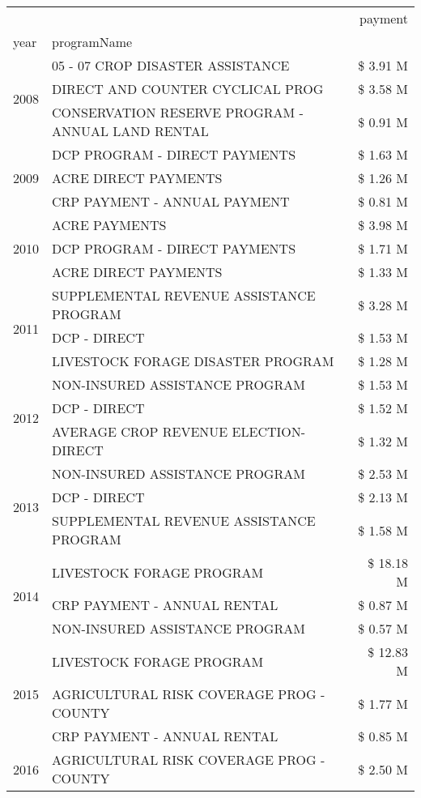 \begin{tabular}{llr}
\toprule
 &  & payment \\
year & programName &  \\
\midrule
\multirow[t]{3}{*}{2008} & 05 - 07 CROP DISASTER ASSISTANCE & \$ 3.91 M \\
 & DIRECT AND COUNTER CYCLICAL PROG & \$ 3.58 M \\
 & CONSERVATION RESERVE PROGRAM - ANNUAL LAND RENTAL & \$ 0.91 M \\
\cline{1-3}
\multirow[t]{3}{*}{2009} & DCP PROGRAM - DIRECT PAYMENTS & \$ 1.63 M \\
 & ACRE DIRECT PAYMENTS & \$ 1.26 M \\
 & CRP PAYMENT - ANNUAL PAYMENT & \$ 0.81 M \\
\cline{1-3}
\multirow[t]{3}{*}{2010} & ACRE PAYMENTS & \$ 3.98 M \\
 & DCP PROGRAM - DIRECT PAYMENTS & \$ 1.71 M \\
 & ACRE DIRECT PAYMENTS & \$ 1.33 M \\
\cline{1-3}
\multirow[t]{3}{*}{2011} & SUPPLEMENTAL REVENUE ASSISTANCE PROGRAM & \$ 3.28 M \\
 & DCP - DIRECT & \$ 1.53 M \\
 & LIVESTOCK FORAGE DISASTER PROGRAM & \$ 1.28 M \\
\cline{1-3}
\multirow[t]{3}{*}{2012} & NON-INSURED ASSISTANCE PROGRAM & \$ 1.53 M \\
 & DCP - DIRECT & \$ 1.52 M \\
 & AVERAGE CROP REVENUE ELECTION-DIRECT & \$ 1.32 M \\
\cline{1-3}
\multirow[t]{3}{*}{2013} & NON-INSURED ASSISTANCE PROGRAM & \$ 2.53 M \\
 & DCP - DIRECT & \$ 2.13 M \\
 & SUPPLEMENTAL REVENUE ASSISTANCE PROGRAM & \$ 1.58 M \\
\cline{1-3}
\multirow[t]{3}{*}{2014} & LIVESTOCK FORAGE PROGRAM & \$ 18.18 M \\
 & CRP PAYMENT - ANNUAL RENTAL & \$ 0.87 M \\
 & NON-INSURED ASSISTANCE PROGRAM & \$ 0.57 M \\
\cline{1-3}
\multirow[t]{3}{*}{2015} & LIVESTOCK FORAGE PROGRAM & \$ 12.83 M \\
 & AGRICULTURAL RISK COVERAGE PROG - COUNTY & \$ 1.77 M \\
 & CRP PAYMENT - ANNUAL RENTAL & \$ 0.85 M \\
\cline{1-3}
\multirow[t]{3}{*}{2016} & AGRICULTURAL RISK COVERAGE PROG - COUNTY & \$ 2.50 M \\

\end{tabular}
